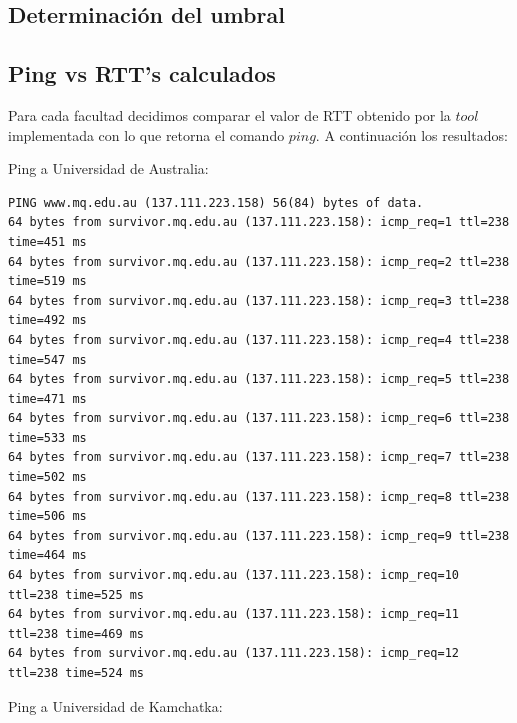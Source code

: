 \subsection{Determinación del umbral}



\subsection{Ping vs RTT's calculados}

Para cada facultad decidimos comparar el valor de RTT obtenido por la $tool$ implementada con lo que retorna el comando $ping$. A continuación los resultados:

Ping a Universidad de Australia:
\begin{verbatim}
PING www.mq.edu.au (137.111.223.158) 56(84) bytes of data.
64 bytes from survivor.mq.edu.au (137.111.223.158): icmp_req=1 ttl=238 time=451 ms
64 bytes from survivor.mq.edu.au (137.111.223.158): icmp_req=2 ttl=238 time=519 ms
64 bytes from survivor.mq.edu.au (137.111.223.158): icmp_req=3 ttl=238 time=492 ms
64 bytes from survivor.mq.edu.au (137.111.223.158): icmp_req=4 ttl=238 time=547 ms
64 bytes from survivor.mq.edu.au (137.111.223.158): icmp_req=5 ttl=238 time=471 ms
64 bytes from survivor.mq.edu.au (137.111.223.158): icmp_req=6 ttl=238 time=533 ms
64 bytes from survivor.mq.edu.au (137.111.223.158): icmp_req=7 ttl=238 time=502 ms
64 bytes from survivor.mq.edu.au (137.111.223.158): icmp_req=8 ttl=238 time=506 ms
64 bytes from survivor.mq.edu.au (137.111.223.158): icmp_req=9 ttl=238 time=464 ms
64 bytes from survivor.mq.edu.au (137.111.223.158): icmp_req=10 ttl=238 time=525 ms
64 bytes from survivor.mq.edu.au (137.111.223.158): icmp_req=11 ttl=238 time=469 ms
64 bytes from survivor.mq.edu.au (137.111.223.158): icmp_req=12 ttl=238 time=524 ms
\end{verbatim}

Ping a Universidad de Kamchatka:

